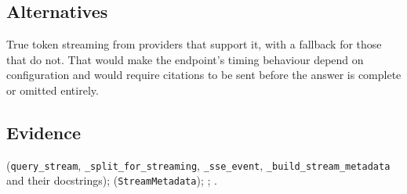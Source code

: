 \subsection*{Alternatives}

True token streaming from providers that support it, with a fallback for those
that do not. That would make the endpoint's timing behaviour depend on
configuration and would require citations to be sent before the answer is
complete or omitted entirely.

\subsection*{Evidence}

(\texttt{query\_stream}, \texttt{\_split\_for\_streaming}, \texttt{\_sse\_event},
\texttt{\_build\_stream\_metadata} and their docstrings);
(\texttt{StreamMetadata}); ;
.
